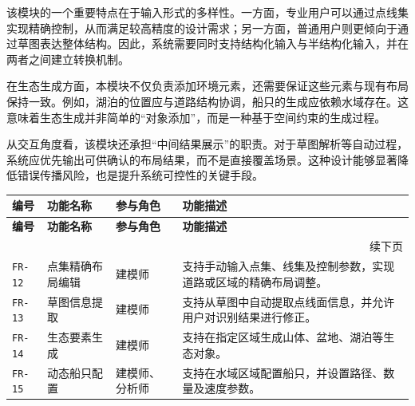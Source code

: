\documentclass[UTF8,a4paper,10pt]{ctexart}
\begin{document}
该模块的一个重要特点在于输入形式的多样性。一方面，专业用户可以通过点线集实现精确控制，从而满足较高精度的设计需求；另一方面，普通用户则更倾向于通过草图表达整体结构。因此，系统需要同时支持结构化输入与半结构化输入，并在两者之间建立转换机制。

在生态生成方面，本模块不仅负责添加环境元素，还需要保证这些元素与现有布局保持一致。例如，湖泊的位置应与道路结构协调，船只的生成应依赖水域存在。这意味着生态生成并非简单的“对象添加”，而是一种基于空间约束的生成过程。

从交互角度看，该模块还承担“中间结果展示”的职责。对于草图解析等自动过程，系统应优先输出可供确认的布局结果，而不是直接覆盖场景。这种设计能够显著降低错误传播风险，也是提升系统可控性的关键手段。

{
\renewcommand{\arraystretch}{1.35}

\begin{longtable}{p{1.8cm} p{2.6cm} p{2.2cm} p{6.2cm}}
\toprule
\rowcolor{gray!20}
\textbf{编号} & \textbf{功能名称} & \textbf{参与角色} & \textbf{功能描述} \\
\midrule
\endfirsthead

\toprule
\rowcolor{gray!20}
\textbf{编号} & \textbf{功能名称} & \textbf{参与角色} & \textbf{功能描述} \\
\midrule
\endhead

\midrule
\multicolumn{4}{r}{\small 续下页}\\
\endfoot

\bottomrule
\endlastfoot

\texttt{FR-12} & 点集精确布局编辑 & 建模师 & 支持手动输入点集、线集及控制参数，实现道路或区域的精确布局调整。 \\
\texttt{FR-13} & 草图信息提取 & 建模师 & 支持从草图中自动提取点线面信息，并允许用户对识别结果进行修正。 \\
\texttt{FR-14} & 生态要素生成 & 建模师 & 支持在指定区域生成山体、盆地、湖泊等生态对象。 \\
\texttt{FR-15} & 动态船只配置 & 建模师、分析师 & 支持在水域区域配置船只，并设置路径、数量及速度参数。 \\

\end{longtable}
}
\end{document}
